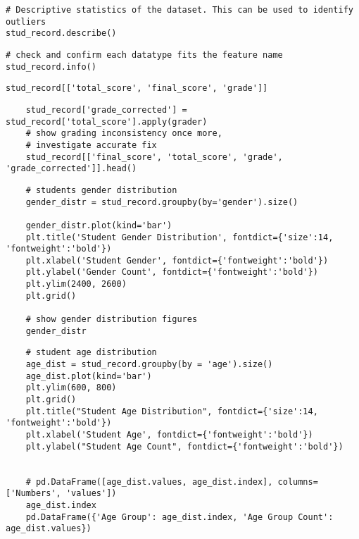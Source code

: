\label{code:dataset_head}
\begin{verbatim}
# Descriptive statistics of the dataset. This can be used to identify outliers
stud_record.describe()
\end{verbatim}

\label{code:dataset_head}
\begin{verbatim}
# check and confirm each datatype fits the feature name
stud_record.info()
\end{verbatim}


\label{code:inconsistent_grading}
\begin{verbatim}
stud_record[['total_score', 'final_score', 'grade']]
\end{verbatim}


\label{code:dataset_head}
\begin{verbatim}
	stud_record['grade_corrected'] = stud_record['total_score'].apply(grader)
	# show grading inconsistency once more, 
	# investigate accurate fix
	stud_record[['final_score', 'total_score', 'grade', 'grade_corrected']].head()
\end{verbatim}


\label{code:dataset_head}
\begin{verbatim}
	# students gender distribution
	gender_distr = stud_record.groupby(by='gender').size()
	
	gender_distr.plot(kind='bar')
	plt.title('Student Gender Distribution', fontdict={'size':14, 'fontweight':'bold'})
	plt.xlabel('Student Gender', fontdict={'fontweight':'bold'})
	plt.ylabel('Gender Count', fontdict={'fontweight':'bold'})
	plt.ylim(2400, 2600)
	plt.grid()
	
	# show gender distribution figures
	gender_distr
\end{verbatim}


\label{code:student_age}
\begin{verbatim}
	# student age distribution
	age_dist = stud_record.groupby(by = 'age').size()
	age_dist.plot(kind='bar')
	plt.ylim(600, 800)
	plt.grid()
	plt.title("Student Age Distribution", fontdict={'size':14, 'fontweight':'bold'})
	plt.xlabel('Student Age', fontdict={'fontweight':'bold'})
	plt.ylabel("Student Age Count", fontdict={'fontweight':'bold'})
	
	
	# pd.DataFrame([age_dist.values, age_dist.index], columns=['Numbers', 'values'])
	age_dist.index
	pd.DataFrame({'Age Group': age_dist.index, 'Age Group Count': age_dist.values})
	
\end{verbatim}


